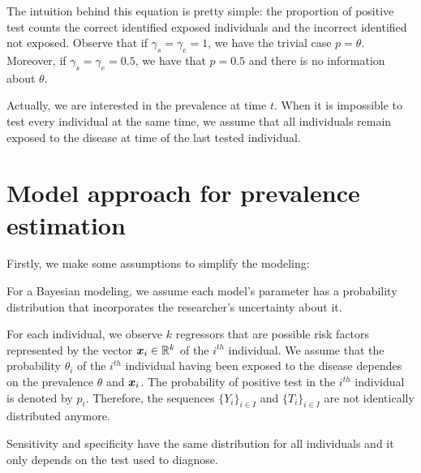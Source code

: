 The intuition behind this equation is pretty simple: the proportion
of positive test counts the correct identified exposed individuals and the
incorrect identified not exposed. Observe that if $\gamma_s = \gamma_e = 1$, we have the trivial case $p =
\theta$. Moreover, if $\gamma_s = \gamma_e = 0.5$, we have that
$p = 0.5$ and there is no information about $\theta$. 

\begin{remark}
  Actually, we are interested in the prevalence at time $t$. When it is 
  impossible to test every individual at the same time, we assume that all
  individuals remain exposed to the disease at time of the last tested individual. 
\end{remark}


\section{Model approach for prevalence estimation}

Firstly, we make some assumptions to simplify the modeling:

\begin{assumption}  
  For a Bayesian modeling, we assume each model's parameter has a probability distribution that incorporates the researcher's uncertainty about it. 
\end{assumption}

\begin{assumption}
  For each individual, we observe $k$ regressors that are possible
  risk factors represented by the vector $\boldsymbol{x}_i \in \mathbb{R}^{k}$ of the $i^{th}$
  individual. We assume that the probability $\theta_i$ of the $i^{th}$ individual having been exposed
  to the disease dependes on the prevalence $\theta$ and $\boldsymbol{x}_i$. The
  probability of positive test in the $i^{th}$ individual is denoted by $p_i$. Therefore, the sequences $\{Y_i\}_{i \in I}$ and $\{T_i\}_{i \in I}$ are not
  identically distributed anymore.
\end{assumption}

\begin{assumption}
  Sensitivity and specificity have the same distribution for all
  individuals and it only depends on the test used to diagnose. 
\end{assumption}

